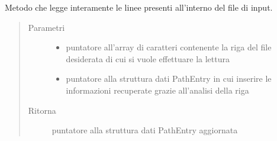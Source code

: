 \documentclass[letterpaper,10pt,italian,openany,oneside]{sphinxmanual}
\begin{document}
\begin{fulllineitems}
\label{\detokenize{code/inputscan:c.inputLineAnalisis}}
Metodo che legge interamente le linee presenti all’interno del file di input.
\begin{quote}\begin{description}
\item[{Parametri}] \leavevmode\begin{itemize}
\item {} 
 \textendash{} puntatore all’array di caratteri contenente la riga del file desiderata di cui si vuole effettuare la lettura

\item {} 
 \textendash{} puntatore alla struttura dati PathEntry in cui inserire le informazioni recuperate grazie all’analisi della riga

\end{itemize}

\item[{Ritorna}] \leavevmode
puntatore alla struttura dati PathEntry aggiornata

\end{description}\end{quote}

\end{fulllineitems}

\end{document}
